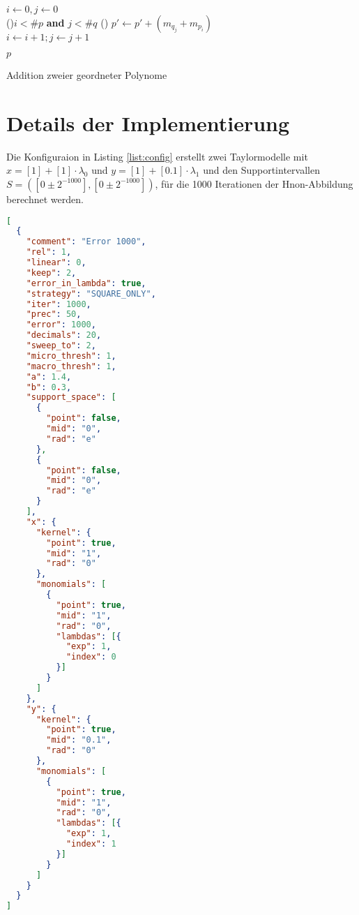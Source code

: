 \begin{algorithm}[H]
\SetAlgoLined
\label{algo:add}
$i \gets 0, j \gets 0$ \\
\While(){$i < \#p$ \textbf{and} $j  < \#q$} {
    \uElse(){
        $p' \gets p' + (m_{q_j} + m_{p_i})$\\
        $i \gets i+1; j \gets j +1 $\\
    }
}

\Return $p$

 \caption{Addition zweier geordneter Polynome}
\end{algorithm}

\section*{Details der Implementierung}
Die Konfiguraion in Listing \ref{list:config} erstellt zwei Taylormodelle mit $x = [1] + [1] \cdot \lambda_0$ und $y = [1] + [0.1] \cdot \lambda_1 $ und den Supportintervallen $S=([0\pm2^{-1000}], [0\pm2^{-1000}])$, für die 1000 Iterationen der H\e non-Abbildung berechnet werden.

\begin{lstlisting}[language=JSON, caption=Bespielkonfiguration,captionpos=b, label=list:config]
 [
  {
    "comment": "Error 1000",
    "rel": 1,
    "linear": 0,
    "keep": 2,
    "error_in_lambda": true,
    "strategy": "SQUARE_ONLY",
    "iter": 1000,
    "prec": 50,
    "error": 1000,
    "decimals": 20,
    "sweep_to": 2,
    "micro_thresh": 1,
    "macro_thresh": 1,
    "a": 1.4,
    "b": 0.3,
    "support_space": [
      {
        "point": false,
        "mid": "0",
        "rad": "e"
      },
      {
        "point": false,
        "mid": "0",
        "rad": "e"
      }
    ],
    "x": {
      "kernel": {
        "point": true,
        "mid": "1",
        "rad": "0"
      },
      "monomials": [
        {
          "point": true,
          "mid": "1",
          "rad": "0",
          "lambdas": [{
            "exp": 1,
            "index": 0
          }]
        }
      ]
    },
    "y": {
      "kernel": {
        "point": true,
        "mid": "0.1",
        "rad": "0"
      },
      "monomials": [
        {
          "point": true,
          "mid": "1",
          "rad": "0",
          "lambdas": [{
            "exp": 1,
            "index": 1
          }]
        }
      ]
    }
  }
]
\end{lstlisting}

